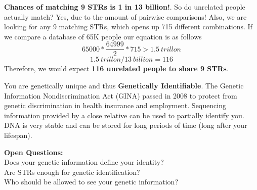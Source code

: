\documentclass[hyperref,openany, oneside]{labbook} %
\begin{document}
\textbf{Chances of matching 9 STRs is 1 in 13 billion!}. So do unrelated people actually match? Yes, due to the amount of pairwise comparisons! Also, we are looking for any 9 matching STRs, which opens up 715 different combinations. If we compare a database of 65K people our equation is as follows \[ 65000*\frac{64999}{2}*715 > 1.5 \ trillon \] \[ 1.5 \ trillon / 13 \ billion = 116 \]
Therefore, we would expect \textbf{116 unrelated people to share 9 STRs}. 

\vspace{-0.3cm}
\vspace{-0.2cm}
You are genetically unique and thus \textbf{Genetically Identifiable}. The Genetic Information Nondiscrimination Act (GINA) passed in 2008 to protect from genetic discrimination in health insurance and employment. Sequencing information provided by a close relative can be used to partially identify you. DNA is very stable and can be stored for long periods of time (long after your lifespan).

\textbf{Open Questions:}\\
Does your genetic information define your identity? \\ 
Are STRs enough for genetic identification? \\
Who should be allowed to see your genetic information?
\end{document}
